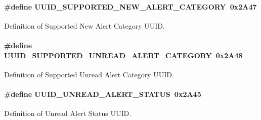 \paragraph[{\texorpdfstring{U\+U\+I\+D\+\_\+\+S\+U\+P\+P\+O\+R\+T\+E\+D\+\_\+\+N\+E\+W\+\_\+\+A\+L\+E\+R\+T\+\_\+\+C\+A\+T\+E\+G\+O\+RY}{UUID_SUPPORTED_NEW_ALERT_CATEGORY}}]{\setlength{\rightskip}{0pt plus 5cm}\#define U\+U\+I\+D\+\_\+\+S\+U\+P\+P\+O\+R\+T\+E\+D\+\_\+\+N\+E\+W\+\_\+\+A\+L\+E\+R\+T\+\_\+\+C\+A\+T\+E\+G\+O\+RY~0x2\+A47}\hypertarget{group___b_l_e___a_n_s_gae79df2e16529fe8fc52a4e49fd584123}{}\label{group___b_l_e___a_n_s_gae79df2e16529fe8fc52a4e49fd584123}
Definition of Supported New Alert Category U\+U\+ID. 
\paragraph[{\texorpdfstring{U\+U\+I\+D\+\_\+\+S\+U\+P\+P\+O\+R\+T\+E\+D\+\_\+\+U\+N\+R\+E\+A\+D\+\_\+\+A\+L\+E\+R\+T\+\_\+\+C\+A\+T\+E\+G\+O\+RY}{UUID_SUPPORTED_UNREAD_ALERT_CATEGORY}}]{\setlength{\rightskip}{0pt plus 5cm}\#define U\+U\+I\+D\+\_\+\+S\+U\+P\+P\+O\+R\+T\+E\+D\+\_\+\+U\+N\+R\+E\+A\+D\+\_\+\+A\+L\+E\+R\+T\+\_\+\+C\+A\+T\+E\+G\+O\+RY~0x2\+A48}\hypertarget{group___b_l_e___a_n_s_ga33eb9ad2d28d6721c6c147fc58e22fa3}{}\label{group___b_l_e___a_n_s_ga33eb9ad2d28d6721c6c147fc58e22fa3}
Definition of Supported Unread Alert Category U\+U\+ID. 
\paragraph[{\texorpdfstring{U\+U\+I\+D\+\_\+\+U\+N\+R\+E\+A\+D\+\_\+\+A\+L\+E\+R\+T\+\_\+\+S\+T\+A\+T\+US}{UUID_UNREAD_ALERT_STATUS}}]{\setlength{\rightskip}{0pt plus 5cm}\#define U\+U\+I\+D\+\_\+\+U\+N\+R\+E\+A\+D\+\_\+\+A\+L\+E\+R\+T\+\_\+\+S\+T\+A\+T\+US~0x2\+A45}\hypertarget{group___b_l_e___a_n_s_ga2ff36a16f151a482454279c0a8e5fa87}{}\label{group___b_l_e___a_n_s_ga2ff36a16f151a482454279c0a8e5fa87}
Definition of Unread Alert Status U\+U\+ID. 

